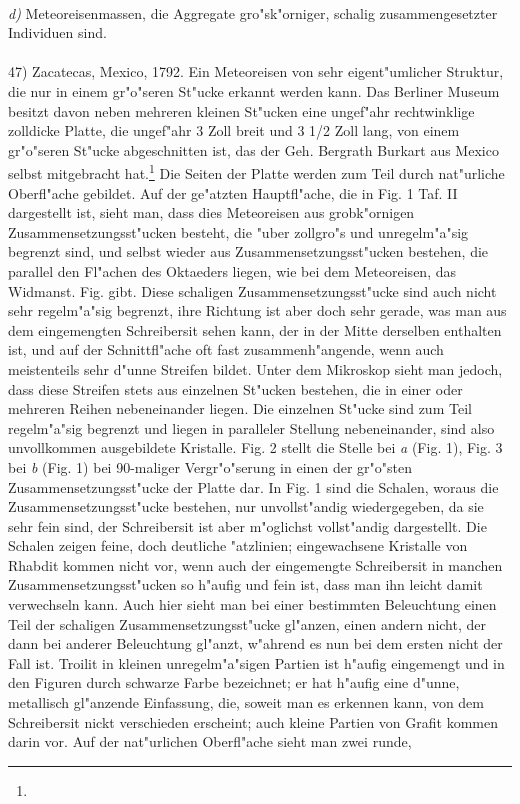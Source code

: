 \documentclass[a4paper, 11pt, oneside]{article}
\begin{document}
\paragraph{}
\emph{d)} Meteoreisenmassen, die Aggregate gro"sk"orniger, schalig zusammengesetzter Individuen sind.
\vspace{\medskipamount}
\paragraph{}
47) Zacatecas, Mexico, 1792. Ein Meteoreisen von sehr eigent"umlicher Struktur, die nur in einem gr"o"seren St"ucke erkannt werden kann. Das Berliner Museum besitzt davon neben mehreren kleinen St"ucken eine ungef"ahr rechtwinklige zolldicke Platte, die ungef"ahr 3 Zoll breit und 3 1/2 Zoll lang, von einem gr"o"seren St"ucke abgeschnitten ist, das der Geh. Bergrath Burkart aus Mexico selbst mitgebracht hat.\footnote{} Die Seiten der Platte werden zum Teil durch nat"urliche Oberfl"ache gebildet. Auf der ge"atzten Hauptfl"ache, die in Fig. 1 Taf. II dargestellt ist, sieht man, dass dies Meteoreisen aus grobk"ornigen Zusammensetzungsst"ucken besteht, die "uber zollgro"s und unregelm"a"sig begrenzt sind, und selbst wieder aus Zusammensetzungsst"ucken bestehen, die parallel den Fl"achen des Oktaeders liegen, wie bei dem Meteoreisen, das Widmanst. Fig. gibt. Diese schaligen Zusammensetzungsst"ucke sind auch nicht sehr regelm"a"sig begrenzt, ihre Richtung ist aber doch sehr gerade, was man aus dem eingemengten Schreibersit sehen kann, der in der Mitte derselben enthalten ist, und auf der Schnittfl"ache oft fast zusammenh"angende, wenn auch meistenteils sehr d"unne Streifen bildet. Unter dem Mikroskop sieht man jedoch, dass diese Streifen stets aus einzelnen St"ucken bestehen, die in einer oder mehreren Reihen nebeneinander liegen. Die einzelnen St"ucke sind zum Teil regelm"a"sig begrenzt und liegen in paralleler Stellung nebeneinander, sind also unvollkommen ausgebildete Kristalle. Fig. 2 stellt die Stelle bei \emph{a} (Fig. 1), Fig. 3 bei \emph{b} (Fig. 1) bei 90-maliger Vergr"o"serung in einen der gr"o"sten Zusammensetzungsst"ucke der Platte dar. In Fig. 1 sind die Schalen, woraus die Zusammensetzungsst"ucke bestehen, nur unvollst"andig wiedergegeben, da sie sehr fein sind, der Schreibersit ist aber m"oglichst vollst"andig dargestellt. Die Schalen zeigen feine, doch deutliche "atzlinien; eingewachsene Kristalle von Rhabdit kommen nicht vor, wenn auch der eingemengte Schreibersit in manchen Zusammensetzungsst"ucken so h"aufig und fein ist, dass man ihn leicht damit verwechseln kann. Auch hier sieht man bei einer bestimmten Beleuchtung einen Teil der schaligen Zusammensetzungsst"ucke gl"anzen, einen andern nicht, der dann bei anderer Beleuchtung gl"anzt, w"ahrend es nun bei dem ersten nicht der Fall ist. Troilit in kleinen unregelm"a"sigen Partien ist h"aufig eingemengt und in den Figuren durch schwarze Farbe bezeichnet; er hat h"aufig eine d"unne, metallisch gl"anzende Einfassung, die, soweit man es erkennen kann, von dem Schreibersit nickt verschieden erscheint; auch kleine Partien von Grafit kommen darin vor. Auf der nat"urlichen Oberfl"ache sieht man zwei runde, 
\end{document}
